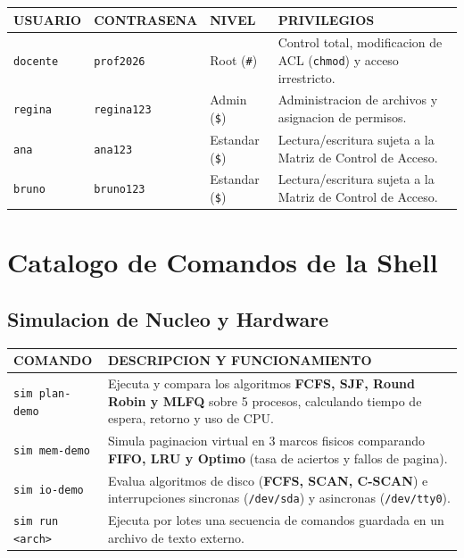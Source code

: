 \documentclass[11pt,a4paper]{article}
\begin{document}
	\begin{center}
		\renewcommand{\arraystretch}{1.3}
		\begin{tabularx}{\textwidth}{|l|l|l|X|}
			\hline
			\rowcolor{bordergreen}
			\color{matrixgreen}\textbf{USUARIO} & \color{matrixgreen}\textbf{CONTRASENA} & \color{matrixgreen}\textbf{NIVEL} & \color{matrixgreen}\textbf{PRIVILEGIOS} \\
			\hline
			\rowcolor{termcard} \texttt{docente} & \texttt{prof2026}  & Root (\texttt{\#}) & Control total, modificacion de ACL (\texttt{chmod}) y acceso irrestricto. \\
			\hline
			\rowcolor{bgblack}  \texttt{regina}  & \texttt{regina123} & Admin (\texttt{\$}) & Administracion de archivos y asignacion de permisos. \\
			\hline
			\rowcolor{termcard} \texttt{ana}     & \texttt{ana123}    & Estandar (\texttt{\$}) & Lectura/escritura sujeta a la Matriz de Control de Acceso. \\
			\hline
			\rowcolor{bgblack}  \texttt{bruno}   & \texttt{bruno123}  & Estandar (\texttt{\$}) & Lectura/escritura sujeta a la Matriz de Control de Acceso. \\
			\hline
		\end{tabularx}
	\end{center}
	
	\section{Catalogo de Comandos de la Shell}
	
	\subsection{Simulacion de Nucleo y Hardware}
	\begin{tabularx}{\textwidth}{|l|X|}
		\hline
		\rowcolor{bordergreen} \color{matrixgreen}\textbf{COMANDO} & \color{matrixgreen}\textbf{DESCRIPCION Y FUNCIONAMIENTO} \\
		\hline
		\rowcolor{termcard} \texttt{sim plan-demo} & Ejecuta y compara los algoritmos \textbf{FCFS, SJF, Round Robin y MLFQ} sobre 5 procesos, calculando tiempo de espera, retorno y uso de CPU. \\
		\hline
		\rowcolor{bgblack}  \texttt{sim mem-demo}  & Simula paginacion virtual en 3 marcos fisicos comparando \textbf{FIFO, LRU y Optimo} (tasa de aciertos y fallos de pagina). \\
		\hline
		\rowcolor{termcard} \texttt{sim io-demo}   & Evalua algoritmos de disco (\textbf{FCFS, SCAN, C-SCAN}) e interrupciones sincronas (\texttt{/dev/sda}) y asincronas (\texttt{/dev/tty0}). \\
		\hline
		\rowcolor{bgblack}  \texttt{sim run <arch>} & Ejecuta por lotes una secuencia de comandos guardada en un archivo de texto externo. \\
		\hline
	\end{tabularx}
	
\end{document}
